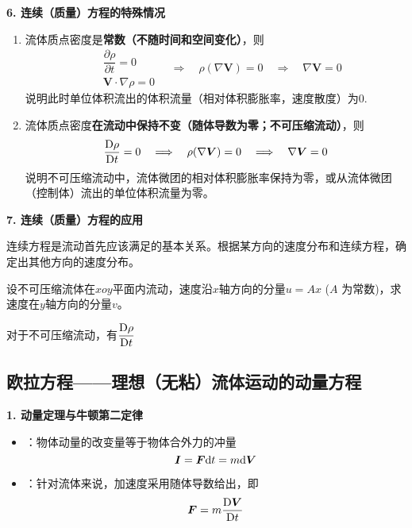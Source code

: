 \noindent \textbf{6. 连续（质量）方程的特殊情况}
\begin{enumerate}[\hspace*{1.5em} (1) ]
	\item 流体质点密度是\textbf{常数（不随时间和空间变化）}，则
	\begin{equation*}
		\begin{aligned}
			&\dfrac{\partial \rho}{\partial t} = 0\\
			&\bm{V} \cdot \nabla \rho = 0
		\end{aligned} \quad \Longrightarrow \quad \rho (\nabla \bm{V}) = 0 \quad \Longrightarrow \quad \nabla \bm{V} = 0
	\end{equation*}
	说明此时单位体积流出的体积流量（相对体积膨胀率，速度散度）为0.
	
	\item 流体质点密度\textbf{在流动中保持不变（随体导数为零；不可压缩流动）}，则
	\begin{equation*}
		\dfrac{{\rm{D}} \rho}{{\rm{D}} t} = 0 \quad \Longrightarrow \quad \rho (\nabla \bm{V}) = 0 \quad \Longrightarrow \quad \nabla \bm{V} = 0
	\end{equation*}
	说明不可压缩流动中，流体微团的相对体积膨胀率保持为零，或从流体微团（控制体）流出的单位体积流量为零。
\end{enumerate}
\vspace*{-1em}
\vspace*{0.5em}

\noindent \textbf{7. 连续（质量）方程的应用}

连续方程是流动首先应该满足的基本关系。根据某方向的速度分布和连续方程，确定出其他方向的速度分布。

\examples 设不可压缩流体在$xoy$平面内流动，速度沿$x$轴方向的分量$u = Ax$ ($A$ 为常数)，求速度在$y$轴方向的分量$v$。

\solve 对于不可压缩流动，有$\dfrac{{\rm{D}} \rho}{{\rm{D}} t}$

\subsection{欧拉方程——理想（无粘）流体运动的动量方程}

\noindent \textbf{1. 动量定理与牛顿第二定律}
\begin{itemize}
	\item {}：物体动量的改变量等于物体合外力的冲量
	\begin{equation}
		\bm{I} = \bm{F} {\rm{d}} t = m {\rm{d}} \bm{V}
	\end{equation}

	\item {}：针对流体来说，加速度采用随体导数给出，即
	\begin{equation}
		\bm{F} = m \dfrac{{\rm{D}} \bm{V}}{{\rm{D}} t}
	\end{equation}
	
\end{itemize}
\vspace*{0.5em}

